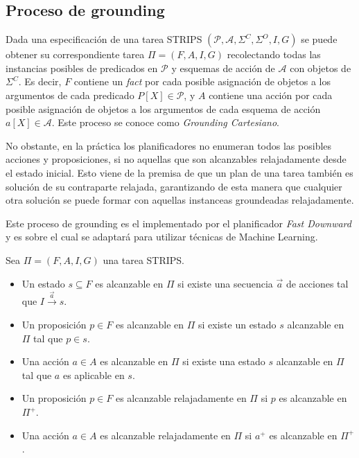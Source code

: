 \subsection{Proceso de grounding}

Dada una especificación de una tarea STRIPS $(\mathcal{P}, \mathcal{A},
\Sigma^{C}, \Sigma^{O}, I, G)$ se puede obtener su correspondiente tarea $\Pi =
(F, A, I, G)$ recolectando todas las instancias posibles de predicados en
$\mathcal{P}$ y esquemas de acción de $\mathcal{A}$ con objetos de $\Sigma^{C}$.
Es decir, $F$ contiene un \emph{fact} por cada posible asignación de objetos a
los argumentos de cada predicado $P[X] \in \mathcal{P}$, y $A$ contiene una
acción por cada posible asignación de objetos a los argumentos de cada esquema
de acción $a[X] \in \mathcal{A}$. Este proceso se conoce como \emph{Grounding
Cartesiano}.

No obstante, en la práctica los planificadores no enumeran todos las posibles
acciones y proposiciones, si no aquellas que son alcanzables relajadamente desde
el estado inicial. Esto viene de la premisa de que un plan de una tarea también
es solución de su contraparte relajada, garantizando de esta manera que
cualquier otra solución se puede formar con aquellas instanceas groundeadas
relajadamente.

Este proceso de grounding es el implementado por el planificador \emph{Fast
Downward} \citep{Helmert-2011} y es sobre el cual se adaptará para utilizar
técnicas de Machine Learning.

\begin{mydef}
    Sea $\Pi = (F, A, I, G)$ una tarea STRIPS.    
    \begin{itemize}
        \item Un estado $s \subseteq F$ es alcanzable en $\Pi$ si existe una
        secuencia $\vec{a}$ de acciones tal que $I \xrightarrow{\vec{a}} s$.
    
        \item Un proposición $p \in F$ es alcanzable en $\Pi$ si existe un estado
        $s$ alcanzable en $\Pi$ tal que $p \in s$.

        \item Una acción $a \in A$ es alcanzable en $\Pi$ si existe una estado $s$
        alcanzable en $\Pi$ tal que $a$ es aplicable en $s$.

        \item Un proposición $p \in F$ es alcanzable relajadamente en $\Pi$ si
        $p$ es alcanzable en $\Pi^{+}$.

        \item Una acción $a \in A$ es alcanzable relajadamente en $\Pi$ si
        $a^{+}$ es alcanzable en $\Pi^{+}$.
    \end{itemize}
\end{mydef}


